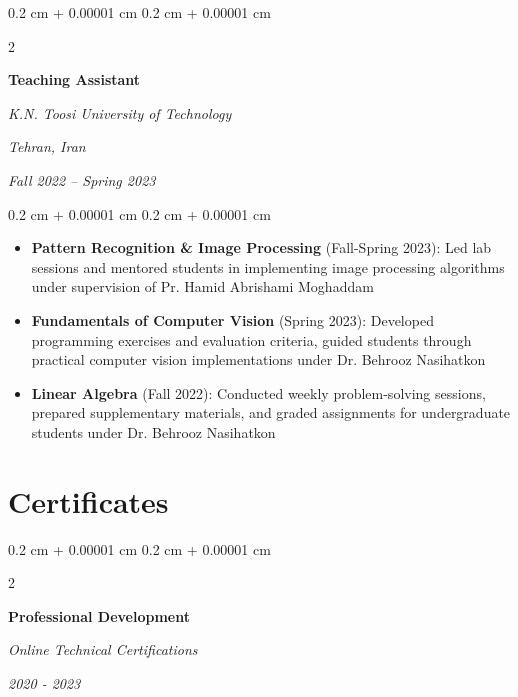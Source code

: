 \documentclass[10pt, letterpaper]{article}
\newenvironment{highlights}{
    \begin{itemize}[
        topsep=0.10 cm,
        parsep=0.10 cm,
        partopsep=0pt,
        itemsep=0pt,
        leftmargin=0.4 cm + 10pt
    ]
}{
    \end{itemize}
} %
\newenvironment{onecolentry}{
    \begin{adjustwidth}{
        0.2 cm + 0.00001 cm
    }{
        0.2 cm + 0.00001 cm
    }
}{
    \end{adjustwidth}
} %
\newenvironment{twocolentry}[2][]{
    \onecolentry
    \def\secondColumn{#2}
    \setcolumnwidth{\fill, 5.5 cm}
    \begin{paracol}{2}
}{
    \switchcolumn \raggedleft \secondColumn
    \end{paracol}
    \endonecolentry
} %
\begin{document}
	\begin{twocolentry}{
			\textit{Tehran, Iran}    
			
			\textit{Fall 2022 – Spring 2023}}
		\textbf{Teaching Assistant}
		
		\textit{K.N. Toosi University of Technology}
	\end{twocolentry}
	
	\vspace{0.10 cm}
	\begin{onecolentry}
		\begin{highlights}
			\item \textbf{Pattern Recognition \& Image Processing} (Fall-Spring 2023): Led lab sessions and mentored students in implementing image processing algorithms under supervision of Pr. Hamid Abrishami Moghaddam
			\item \textbf{Fundamentals of Computer Vision} (Spring 2023): Developed programming exercises and evaluation criteria, guided students through practical computer vision implementations under Dr. Behrooz Nasihatkon
			\item \textbf{Linear Algebra} (Fall 2022): Conducted weekly problem-solving sessions, prepared supplementary materials, and graded assignments for undergraduate students under Dr. Behrooz Nasihatkon
		\end{highlights}
	\end{onecolentry}
	
	\vspace{0.2 cm}    


	
	\section{Certificates}
	
	\begin{twocolentry}{
			\textit{2020 - 2023}    
			
		}
		\textbf{Professional Development}
		
		\textit{Online Technical Certifications}
	\end{twocolentry}
	
\end{document}
